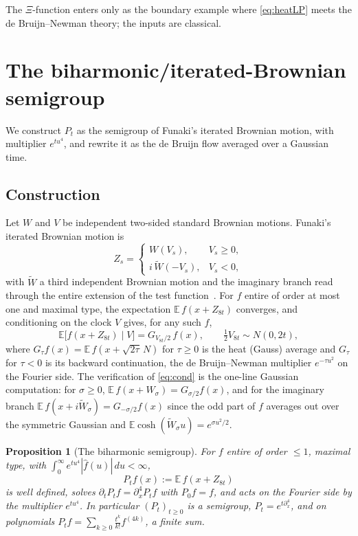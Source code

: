 \documentclass[11pt,reqno]{amsart}
\theoremstyle{plain}
\newtheorem{proposition}[theorem]{Proposition}
\theoremstyle{definition}
\theoremstyle{remark}
\newcommand{\E}{\mathbb E}
\begin{document}
The $\Xi$-function enters only as the boundary example where \eqref{eq:heatLP}
meets the de Bruijn--Newman theory; the inputs are classical.

\section{The biharmonic/iterated-Brownian semigroup}\label{sec:ibm}

We construct $P_t$ as the semigroup of Funaki's iterated Brownian motion, with
multiplier $e^{tu^4}$, and rewrite it as the de Bruijn flow averaged over a
Gaussian time.

\subsection{Construction}
Let $W$ and $V$ be independent two-sided standard Brownian motions. Funaki's
iterated Brownian motion is
\begin{equation}\label{eq:Z}
   Z_s=\begin{cases} W(V_s), & V_s\ge0,\\[2pt]
   i\,\widetilde W(-V_s), & V_s<0,\end{cases}
\end{equation}
with $\widetilde W$ a third independent Brownian motion and the imaginary
branch read through the entire extension of the test
function~\cite{Funaki}. For $f$ entire of order at most one and maximal type,
the expectation $\E\,f(x+Z_{8t})$ converges, and conditioning on the clock $V$
gives, for any such $f$,
\begin{equation}\label{eq:cond}
   \E\bigl[f(x+Z_{8t})\mid V\bigr]=G_{V_{8t}/2}\,f(x),
   \qquad \tfrac12 V_{8t}\sim N(0,2t),
\end{equation}
where $G_\tau f(x)=\E\,f(x+\sqrt{2\tau}\,N)$ for $\tau\ge0$ is the heat (Gauss)
average and $G_\tau$ for $\tau<0$ is its backward continuation, the de
Bruijn--Newman multiplier $e^{-\tau u^2}$ on the Fourier side. The verification
of \eqref{eq:cond} is the one-line Gaussian computation: for $\sigma\ge0$,
$\E\,f(x+W_\sigma)=G_{\sigma/2}f(x)$, and for the imaginary branch
$\E\,f(x+i\widetilde W_\sigma)=G_{-\sigma/2}f(x)$ since the odd part of $f$
averages out over the symmetric Gaussian and $\E\cosh(\widetilde W_\sigma u)
=e^{\sigma u^2/2}$.

\begin{proposition}[The biharmonic semigroup]\label{prop:semigroup}
For $f$ entire of order $\le1$, maximal type, with $\int_0^\infty
e^{tu^4}|\hat f(u)|\,du<\infty$,
\[
   P_tf(x):=\E\,f(x+Z_{8t})
\]
is well defined, solves $\partial_tP_tf=\partial_x^4P_tf$ with $P_0f=f$, and
acts on the Fourier side by the multiplier $e^{tu^4}$. In particular
$(P_t)_{t\ge0}$ is a semigroup, $P_t=e^{t\partial_x^4}$, and on polynomials
$P_tf=\sum_{k\ge0}\frac{t^k}{k!}f^{(4k)}$, a finite sum.
\end{proposition}
\end{document}
